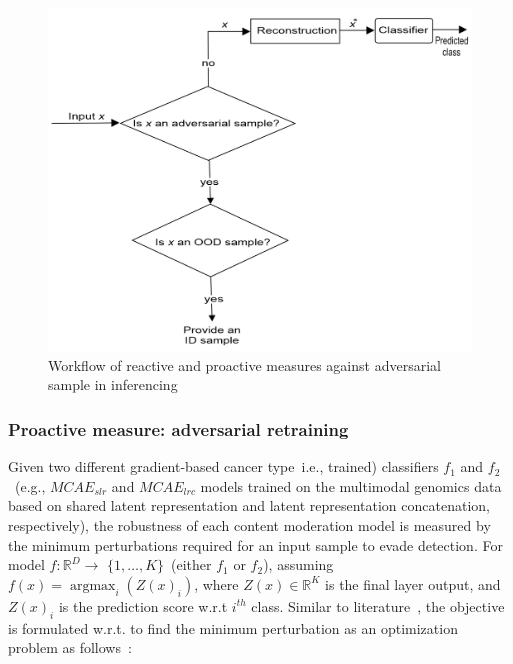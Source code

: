 \begin{figure}[htp!]
    \centering
    \includegraphics[scale=0.9]{images/reactive_measure.png}
    \caption[Reactive and proactive measures in a nutshell against adversarial attacks]{Workflow of reactive and proactive measures against adversarial sample in inferencing}
    \label{fig:reactive_measures}
    \vspace{-4mm}
\end{figure}

\subsubsection{Proactive measure: adversarial retraining}
Given two different gradient-based cancer type~i.e., trained) classifiers $f_1$ and $f_2$~(e.g., $MCAE_{slr}$ and $MCAE_{lrc}$ models trained on the multimodal genomics data based on shared latent representation and latent representation concatenation, respectively), the robustness of each content moderation model is measured by the minimum perturbations required for an input sample to evade detection. For model $f: \mathbb{R}^{D} \rightarrow$ $\{1, \ldots, K\}$~(either $f_1$ or $f_2$), assuming $f(x)=\operatorname{argmax}_{i}\left(Z(x)_{i}\right)$, where $Z(x) \in\mathbb{R}^{K}$ is the final layer output, and $Z(x)_{i}$ is the prediction score w.r.t $i^{th}$ class. Similar to literature~\cite{bhatt2020explainable}, the objective is formulated w.r.t. to find the minimum perturbation as an optimization problem as follows~\cite{bhatt2020explainable}:

